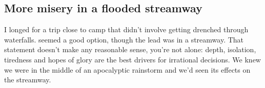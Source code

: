 
\subsection{More misery in a flooded streamway}
\begin{marginfigure}
\end{marginfigure}
I longed for a trip close to camp that didn't involve getting drenched through waterfalls.  seemed a good option, though the lead was in a streamway. That statement doesn't make any reasonable sense, you're not alone: depth, isolation, tiredness and hopes of glory are the best drivers for irrational decisions. We knew we were in the middle of an apocalyptic rainstorm and we'd seen its effects on the  streamway. 

